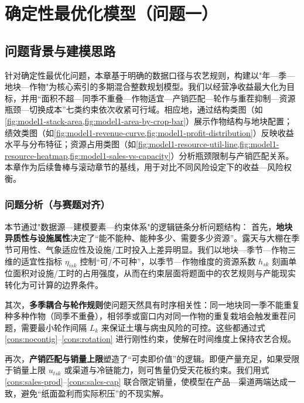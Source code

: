 \graphicspath{{figures/}{../figures/}}
\section{确定性最优化模型（问题一）}
 
\subsection{问题背景与建模思路}
针对确定性最优化问题，本章基于明确的数据口径与农艺规则，构建以"年—季—地块—作物"为核心索引的多期混合整数规划模型。我们以经营净收益最大化为目标，并用“面积不超—同季不重叠—作物适宜—产销匹配—轮作与重茬抑制—资源瓶颈—切换成本”七类约束依次收紧可行域。相应地，通过结构类图（如\cref{fig:model1-stack-area,fig:model1-area-by-crop-bar}）展示作物结构与地块配置；绩效类图（如\cref{fig:model1-revenue-curve,fig:model1-profit-distribution}）反映收益水平与分布特征；资源占用类图（如\cref{fig:model1-resource-util-line,fig:model1-resource-heatmap,fig:model1-sales-vs-capacity}）分析瓶颈限制与产销匹配关系。本章作为后续鲁棒与滚动章节的基线，用于对比不同风险设定下的收益—风险权衡。

\subsubsection{问题分析（与赛题对齐）}
本节通过"数据源—建模要素—约束体系"的逻辑链条分析问题结构：
首先，\textbf{地块异质性与设施属性}决定了“能不能种、能种多少、需要多少资源”。露天与大棚在季节可用性、气象适应性及设施/工时投入上差异明显。我们以地块—季节—作物三维的适宜性指标 $\eta_{isk}$ 控制“可/不可种”，以季节—作物维度的资源系数 $h_{sk}$ 刻画单位面积对设施/工时的占用强度，从而在约束层面将题面中的农艺规则与产能现实转化为可计算的边界条件。

其次，\textbf{多季耦合与轮作规则}使问题天然具有时序相关性：同一地块同一季不能重复种多种作物（同季不重叠），相邻季或窗口内对同一作物的重复栽培会触发重茬问题，需要最小轮作间隔 $L_k$ 来保证土壤与病虫风险的可控。这些都通过式\eqref{cons:nocontig}--\eqref{cons:rotation} 进行刚性约束，使解在时间维度上保持农艺合规。

再次，\textbf{产销匹配与销量上限}塑造了“可卖即价值”的逻辑。即便产量充足，如果受限于销量上限 $u_{tsk}$ 或渠道与冷链能力，则可售量仍受天花板约束。我们用式\eqref{cons:sales-prod}--\eqref{cons:sales-cap} 联合限定销量，使模型在产品—渠道两端达成一致，避免“纸面盈利而实际积压”的不现实解。

